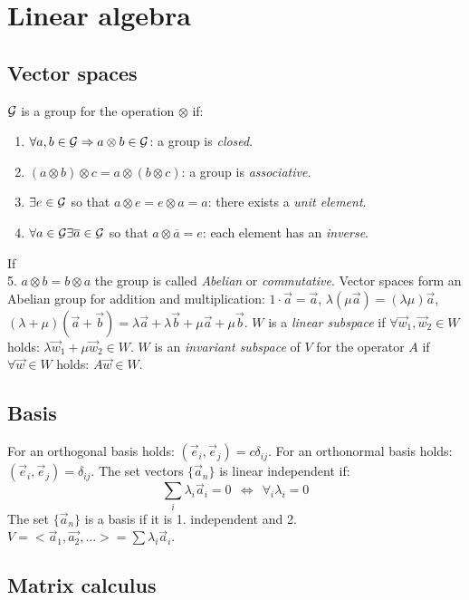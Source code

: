 \documentclass[twoside]{report}
\begin{document}
\chapter{Linear algebra}
\section{Vector spaces}
$\cal G$ is a group for the operation $\otimes$ if:
\begin{enumerate}
\item $\forall a,b\in{\cal G}\Rightarrow a\otimes b\in\cal G$: a group is
      {\it closed}.
\item $(a\otimes b)\otimes c = a\otimes (b\otimes c)$: a group is
      {\it associative}.
\item $\exists e\in{\cal G}$ so that $a\otimes e=e\otimes a=a$: there exists a
      {\it unit element}.
\item $\forall a\in{\cal G}\exists \overline{a}\in{\cal G}$ so that $a\otimes\overline{a}=e$:
      each element has an {\it inverse}.
\end{enumerate}
If\\
\hspace*{4.5mm}5. $a\otimes b=b\otimes a$
\npar
the group is called {\it Abelian} or {\it commutative}.
Vector spaces form an Abelian group for addition and multiplication:
$1\cdot\vec{a}=\vec{a}$, $\lambda(\mu\vec{a})=(\lambda\mu)\vec{a}$,
$(\lambda+\mu)(\vec{a}+\vec{b})=\lambda\vec{a}+\lambda\vec{b}+\mu\vec{a}+\mu\vec{b}$.
\npar
$W$ is a {\it linear subspace} if $\forall \vec{w}_1,\vec{w}_2\in W$
holds: $\lambda\vec{w}_1+\mu\vec{w}_2\in W$.
\npar
$W$ is an {\it invariant subspace} of $V$ for the operator $A$ if
$\forall\vec{w}\in W$ holds: $A\vec{w}\in W$.

\section{Basis}
For an orthogonal basis holds: $(\vec{e}_i,\vec{e}_j)=c\delta_{ij}$. For an
orthonormal basis holds:  $(\vec{e}_i,\vec{e}_j)=\delta_{ij}$.
\npar
The set vectors $\{\vec{a}_n\}$ is linear independent if:
\[
\sum\limits_i\lambda_i\vec{a}_i=0~~\Leftrightarrow~~\forall_i\lambda_i=0
\]
The set $\{\vec{a}_n\}$ is a basis if it is 1. independent and 2.
$V=<\vec{a}_1,\vec{a_2},...>=\sum\lambda_i\vec{a}_i$.

\section{Matrix calculus}
\end{document}
